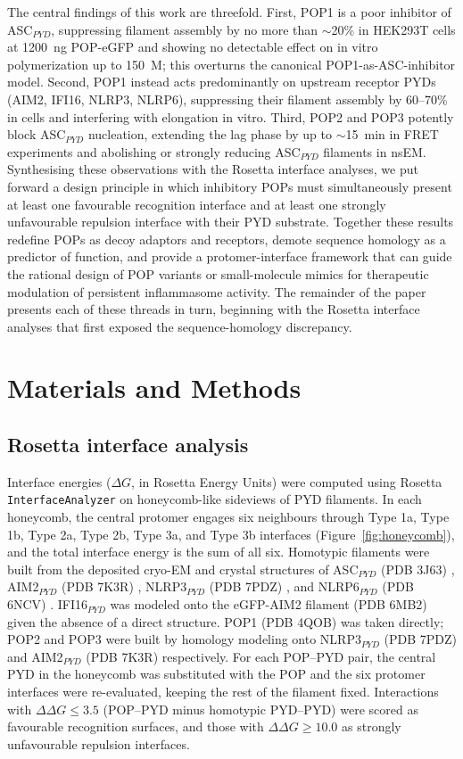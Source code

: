 \documentclass[11pt]{article}
\begin{document}
The central findings of this work are threefold. First, POP1 is a poor
inhibitor of ASC$_{PYD}$, suppressing filament assembly by no more than
$\sim$20\% in HEK293T cells at 1200~ng POP-eGFP and showing no detectable
effect on in vitro polymerization up to 150~\textmu M; this overturns the
canonical POP1-as-ASC-inhibitor model. Second, POP1 instead acts
predominantly on upstream receptor PYDs (AIM2, IFI16, NLRP3, NLRP6),
suppressing their filament assembly by 60--70\% in cells and interfering
with elongation in vitro. Third, POP2 and POP3 potently block ASC$_{PYD}$
nucleation, extending the lag phase by up to $\sim$15~min in FRET
experiments and abolishing or strongly reducing ASC$_{PYD}$ filaments in
nsEM. Synthesising these observations with the Rosetta interface analyses,
we put forward a design principle in which inhibitory POPs must
simultaneously present at least one favourable recognition interface and
at least one strongly unfavourable repulsion interface with their PYD
substrate. Together these results redefine POPs as decoy adaptors and
receptors, demote sequence homology as a predictor of function, and
provide a protomer-interface framework that can guide the rational
design of POP variants or small-molecule mimics for therapeutic
modulation of persistent inflammasome activity. The remainder of the
paper presents each of these threads in turn, beginning with the
Rosetta interface analyses that first exposed the sequence-homology
discrepancy.

\section{Materials and Methods}

\subsection{Rosetta interface analysis}

Interface energies ($\Delta G$, in Rosetta Energy Units) were computed
using Rosetta \texttt{InterfaceAnalyzer} on honeycomb-like sideviews of PYD
filaments. In each honeycomb, the central protomer engages six neighbours
through Type 1a, Type 1b, Type 2a, Type 2b, Type 3a, and Type 3b interfaces
(Figure~\ref{fig:honeycomb}), and the total interface energy is the sum of
all six. Homotypic filaments were built from the deposited cryo-EM and
crystal structures of ASC$_{PYD}$ (PDB 3J63) \citep{lu2014unified},
AIM2$_{PYD}$ (PDB 7K3R) \citep{matyszewski2021distinct}, NLRP3$_{PYD}$
(PDB 7PDZ) \citep{hochheiser2022directionality}, and NLRP6$_{PYD}$
(PDB 6NCV) \citep{shen2019nlrp6}. IFI16$_{PYD}$ was modeled onto the
eGFP-AIM2 filament (PDB 6MB2) given the absence of a direct structure.
POP1 (PDB 4QOB) was taken directly; POP2 and POP3 were built by homology
modeling onto NLRP3$_{PYD}$ (PDB 7PDZ) and AIM2$_{PYD}$ (PDB 7K3R)
respectively. For each POP--PYD pair, the central PYD in the honeycomb was
substituted with the POP and the six protomer interfaces were re-evaluated,
keeping the rest of the filament fixed. Interactions with
$\Delta\Delta G \leq 3.5$ (POP--PYD minus homotypic PYD--PYD) were scored
as favourable recognition surfaces, and those with $\Delta\Delta G \geq 10.0$
as strongly unfavourable repulsion interfaces.
\end{document}
